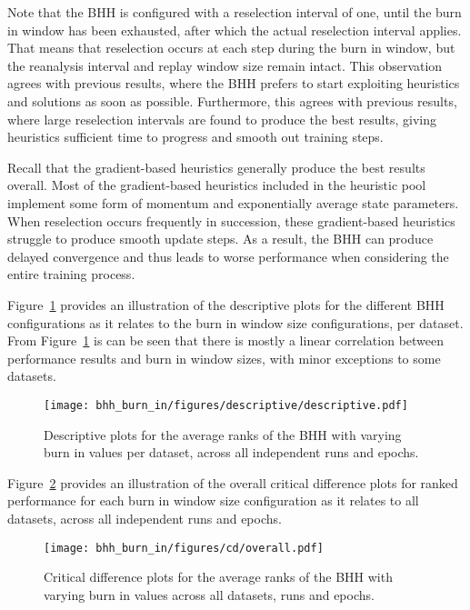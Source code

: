 Note that the \acs{BHH} is configured with a reselection interval of one, until the burn in window has been exhausted, after which the actual reselection interval applies. That means that reselection occurs at each step during the burn in window, but the reanalysis interval and replay window size remain intact. This observation agrees with previous results, where the \acs{BHH} prefers to start exploiting heuristics and solutions as soon as possible. Furthermore, this agrees with previous results, where large reselection intervals are found to produce the best results, giving heuristics sufficient time to progress and smooth out training steps.

Recall that the gradient-based heuristics generally produce the best results overall. Most of the gradient-based heuristics included in the heuristic pool implement some form of momentum and exponentially average state parameters. When reselection occurs frequently in succession, these gradient-based heuristics struggle to produce smooth update steps. As a result, the \acs{BHH} can produce delayed convergence and thus leads to worse performance when considering the entire training process.

Figure~\ref{fig:results:burn_in:descriptive:descriptive} provides an illustration of the descriptive plots for the different \acs{BHH} configurations as it relates to the burn in window size configurations, per dataset. From Figure~\ref{fig:results:burn_in:descriptive:descriptive} is can be seen that there is mostly a linear correlation between performance results and burn in window sizes, with minor exceptions to some datasets.

\begin{figure}[htb]
      \centering
      \texttt{[image: bhh\_burn\_in/figures/descriptive/descriptive.pdf]}
      \caption{Descriptive plots for the average ranks of the \acs{BHH} with varying burn in values per dataset, across all independent runs and epochs.}
      \label{fig:results:burn_in:descriptive:descriptive}
\end{figure}

Figure~\ref{fig:results:burn_in:descriptive:cd} provides an illustration of the overall critical difference plots for ranked performance for each burn in window size configuration as it relates to all datasets, across all independent runs and epochs.

\begin{figure}[htb]
      \centering
      \texttt{[image: bhh\_burn\_in/figures/cd/overall.pdf]}
      \caption{Critical difference plots for the average ranks of the \acs{BHH} with varying burn in values across all datasets, runs and epochs.}
      \label{fig:results:burn_in:descriptive:cd}
\end{figure}


